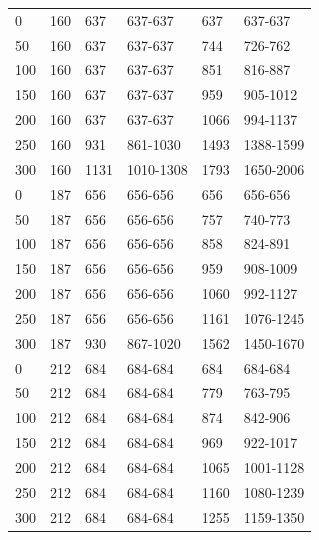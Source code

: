 \begin{table}[H]
{\begin{tabular}{@{\extracolsep{2 pt}}llllll@{}}
			\hline
			0 & 160 & 637 & 637-637 & 637 & 637-637 \\ 
			50 & 160 & 637 & 637-637 & 744 & 726-762 \\ 
			100 & 160 & 637 & 637-637 & 851 & 816-887 \\ 
			150 & 160 & 637 & 637-637 & 959 & 905-1012 \\ 
			200 & 160 & 637 & 637-637 & 1066 & 994-1137 \\ 
			250 & 160 & 931 & 861-1030 & 1493 & 1388-1599 \\ 
			300 & 160 & 1131 & 1010-1308 & 1793 & 1650-2006 \\ 
			\hline
			0 & 187 & 656 & 656-656 & 656 & 656-656 \\ 
			50 & 187 & 656 & 656-656 & 757 & 740-773 \\ 
			100 & 187 & 656 & 656-656 & 858 & 824-891 \\ 
			150 & 187 & 656 & 656-656 & 959 & 908-1009 \\ 
			200 & 187 & 656 & 656-656 & 1060 & 992-1127 \\ 
			250 & 187 & 656 & 656-656 & 1161 & 1076-1245 \\ 
			300 & 187 & 930 & 867-1020 & 1562 & 1450-1670 \\ 
			\hline
			0 & 212 & 684 & 684-684 & 684 & 684-684 \\ 
			50 & 212 & 684 & 684-684 & 779 & 763-795 \\ 
			100 & 212 & 684 & 684-684 & 874 & 842-906 \\ 
			150 & 212 & 684 & 684-684 & 969 & 922-1017 \\ 
			200 & 212 & 684 & 684-684 & 1065 & 1001-1128 \\ 
			250 & 212 & 684 & 684-684 & 1160 & 1080-1239 \\ 
			300 & 212 & 684 & 684-684 & 1255 & 1159-1350 \\
			\hline
			
		\end{tabular}
	}
	\label{ap_b_p_sim}
\end{table}





\renewcommand{\arraystretch}{0.7}

